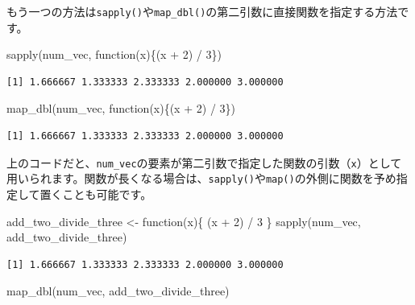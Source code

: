 \documentclass[
  a4paper,
  pandoc,
  ja=standard,
  jafont=haranoaji]{bxjsbook}
\newenvironment{Shaded}{\begin{snugshade}}{\end{snugshade}}
\newcommand{\ControlFlowTok}[1]{\textcolor[rgb]{0.00,0.48,0.65}{#1}}
\newcommand{\DecValTok}[1]{\textcolor[rgb]{0.68,0.00,0.00}{#1}}
\newcommand{\FunctionTok}[1]{\textcolor[rgb]{0.28,0.35,0.67}{#1}}
\newcommand{\NormalTok}[1]{\textcolor[rgb]{0.00,0.48,0.65}{#1}}
\newcommand{\OtherTok}[1]{\textcolor[rgb]{0.00,0.48,0.65}{#1}}
\newcommand{\SpecialCharTok}[1]{\textcolor[rgb]{0.37,0.37,0.37}{#1}}
\begin{document}
もう一つの方法は\texttt{sapply()}や\texttt{map\_dbl()}の第二引数に直接関数を指定する方法です。

\begin{Shaded}
\begin{Highlighting}[numbers=left,,]
\FunctionTok{sapply}\NormalTok{(num\_vec, }\ControlFlowTok{function}\NormalTok{(x)\{(x }\SpecialCharTok{+} \DecValTok{2}\NormalTok{) }\SpecialCharTok{/} \DecValTok{3}\NormalTok{\})}
\end{Highlighting}
\end{Shaded}

\begin{verbatim}
[1] 1.666667 1.333333 2.333333 2.000000 3.000000
\end{verbatim}

\begin{Shaded}
\begin{Highlighting}[numbers=left,,]
\FunctionTok{map\_dbl}\NormalTok{(num\_vec, }\ControlFlowTok{function}\NormalTok{(x)\{(x }\SpecialCharTok{+} \DecValTok{2}\NormalTok{) }\SpecialCharTok{/} \DecValTok{3}\NormalTok{\})}
\end{Highlighting}
\end{Shaded}

\begin{verbatim}
[1] 1.666667 1.333333 2.333333 2.000000 3.000000
\end{verbatim}

上のコードだと、\texttt{num\_vec}の要素が第二引数で指定した関数の引数（\texttt{x}）として用いられます。関数が長くなる場合は、\texttt{sapply()}や\texttt{map()}の外側に関数を予め指定して置くことも可能です。

\begin{Shaded}
\begin{Highlighting}[numbers=left,,]
\NormalTok{add\_two\_divide\_three }\OtherTok{\textless{}{-}} \ControlFlowTok{function}\NormalTok{(x)\{}
\NormalTok{    (x }\SpecialCharTok{+} \DecValTok{2}\NormalTok{) }\SpecialCharTok{/} \DecValTok{3} 
\NormalTok{\}}
\FunctionTok{sapply}\NormalTok{(num\_vec, add\_two\_divide\_three)}
\end{Highlighting}
\end{Shaded}

\begin{verbatim}
[1] 1.666667 1.333333 2.333333 2.000000 3.000000
\end{verbatim}

\begin{Shaded}
\begin{Highlighting}[numbers=left,,]
\FunctionTok{map\_dbl}\NormalTok{(num\_vec, add\_two\_divide\_three)}
\end{Highlighting}
\end{Shaded}
\end{document}
